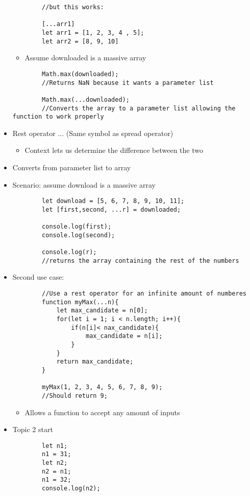 \documentclass{article}
\begin{document}
\begin{itemize}
\begin{lstlisting}
        //but this works:

        [...arr1] 
        let arr1 = [1, 2, 3, 4 , 5];
        let arr2 = [8, 9, 10]
    \end{lstlisting}
    \begin{itemize}
        \item Assume downloaded is a massive array
    \end{itemize}
    \begin{lstlisting}
        Math.max(downloaded);
        //Returns NaN because it wants a parameter list

        Math.max(...downloaded);
        //Converts the array to a parameter list allowing the function to work properly
    \end{lstlisting}
    \item Rest operator ... (Same symbol as spread operator)
    \begin{itemize}
        \item Context lets us determine the difference between the two
    \end{itemize}
    \item Converts from parameter list to array
    \item Scenario: assume download is a massive array
    \begin{lstlisting}
        let download = [5, 6, 7, 8, 9, 10, 11];
        let [first,second, ...r] = downloaded;

        console.log(first);
        console.log(second);

        console.log(r);
        //returns the array containing the rest of the numbers
    \end{lstlisting}
    \item Second use case:
    \begin{lstlisting}
        //Use a rest operator for an infinite amount of numberes
        function myMax(...n){
            let max_candidate = n[0];
            for(let i = 1; i < n.length; i++){
                if(n[i]< nax_candidate){
                    max_candidate = n[i];
                }
            }
            return max_candidate;
        }

        myMax(1, 2, 3, 4, 5, 6, 7, 8, 9);
        //Should return 9;
    \end{lstlisting}
    \begin{itemize}
        \item Allows a function to accept any amount of inputs
    \end{itemize}
    \item Topic 2 start
    \begin{lstlisting}
        let n1;
        n1 = 31;
        let n2;
        n2 = n1;
        n1 = 32;
        console.log(n2);
    \end{lstlisting}
\end{itemize}
\end{document}
